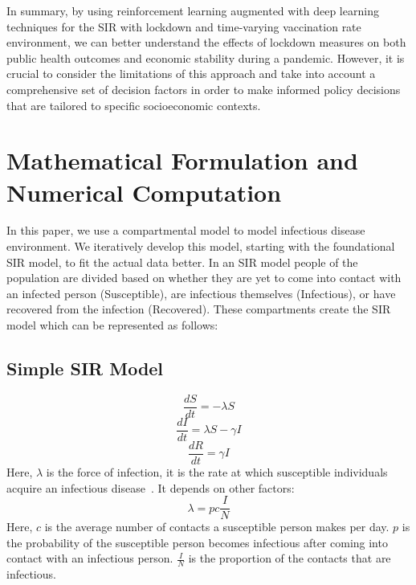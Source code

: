 \documentclass[tikz,fleqn,12pt]{wlscirep}
\begin{document}
In summary, by using reinforcement learning augmented with deep learning techniques for the SIR with lockdown and time-varying vaccination rate environment, we can better understand the effects of lockdown measures on both public health outcomes and economic stability during a pandemic. However, it is crucial to consider the limitations of this approach and take into account a comprehensive set of decision factors in order to make informed policy decisions that are tailored to specific socioeconomic contexts.

\section{Mathematical Formulation and Numerical Computation}
In this paper, we use a compartmental model to model infectious disease environment. We iteratively develop this model, starting with the foundational SIR model, to fit the actual data better. In an SIR model people of the population are divided based on whether they are yet to come into contact with an infected person (Susceptible), are infectious themselves (Infectious), or have recovered from the infection (Recovered). These compartments create the SIR model which can be represented as follows:
\subsection{Simple SIR Model}
\begin{figure}[htbp!]
\centering    
{}
\end{figure}
\begin{equation}
  \frac{d S}{d t}=-\lambda S
  \label{eq:S_without_lockdown}
\end{equation}
\begin{equation}
  \frac{d I}{d t}=\lambda S-\gamma I
  \label{eq:I_without_lockdown}
\end{equation}
\begin{equation}
  \frac{d R}{d t}=\gamma I
  \label{eq:R_without_lockdown}
\end{equation}
Here, $\lambda$ is the force of infection, it is the rate at which susceptible individuals acquire an infectious disease~\cite{hens_aerts_faes_shkedy_lejeune_vandamme_beutels_2010}. It depends on other factors:
\begin{equation}
  \lambda = pc\frac{I}{N}
  \label{eq:lambda_force_of_infection}
\end{equation}
Here, $c$ is the average number of contacts a susceptible person makes per day. $p$ is the probability of the susceptible person becomes infectious after coming into contact with an infectious person. $\frac{I}{N}$ is the proportion of the contacts that are infectious.
\end{document}
